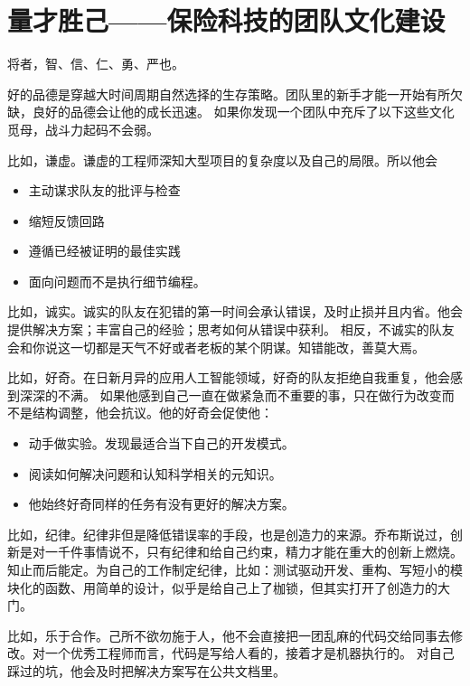 \documentclass[
  oneside]{book}
\providecommand{\tightlist}{%
  \setlength{\itemsep}{0pt}\setlength{\parskip}{0pt}}
\begin{document}
\hypertarget{ux91cfux624dux80dcux5df1ux4fddux9669ux79d1ux6280ux7684ux56e2ux961fux6587ux5316ux5efaux8bbe}{%
\chapter{量才胜己------保险科技的团队文化建设}\label{ux91cfux624dux80dcux5df1ux4fddux9669ux79d1ux6280ux7684ux56e2ux961fux6587ux5316ux5efaux8bbe}}

将者，智、信、仁、勇、严也。

好的品德是穿越大时间周期自然选择的生存策略。团队里的新手才能一开始有所欠缺，良好的品德会让他的成长迅速。
如果你发现一个团队中充斥了以下这些文化觅母，战斗力起码不会弱。

比如，谦虚。谦虚的工程师深知大型项目的复杂度以及自己的局限。所以他会

\begin{itemize}
\tightlist
\item
  主动谋求队友的批评与检查
\item
  缩短反馈回路
\item
  遵循已经被证明的最佳实践
\item
  面向问题而不是执行细节编程。
\end{itemize}

比如，诚实。诚实的队友在犯错的第一时间会承认错误，及时止损并且内省。他会提供解决方案；丰富自己的经验；思考如何从错误中获利。
相反，不诚实的队友会和你说这一切都是天气不好或者老板的某个阴谋。知错能改，善莫大焉。

比如，好奇。在日新月异的应用人工智能领域，好奇的队友拒绝自我重复，他会感到深深的不满。
如果他感到自己一直在做紧急而不重要的事，只在做行为改变而不是结构调整，他会抗议。他的好奇会促使他：

\begin{itemize}
\tightlist
\item
  动手做实验。发现最适合当下自己的开发模式。
\item
  阅读如何解决问题和认知科学相关的元知识。
\item
  他始终好奇同样的任务有没有更好的解决方案。
\end{itemize}

比如，纪律。纪律非但是降低错误率的手段，也是创造力的来源。乔布斯说过，创新是对一千件事情说不，只有纪律和给自己约束，精力才能在重大的创新上燃烧。
知止而后能定。为自己的工作制定纪律，比如：测试驱动开发、重构、写短小的模块化的函数、用简单的设计，似乎是给自己上了枷锁，但其实打开了创造力的大门。

比如，乐于合作。己所不欲勿施于人，他不会直接把一团乱麻的代码交给同事去修改。对一个优秀工程师而言，代码是写给人看的，接着才是机器执行的。
对自己踩过的坑，他会及时把解决方案写在公共文档里。
\end{document}
